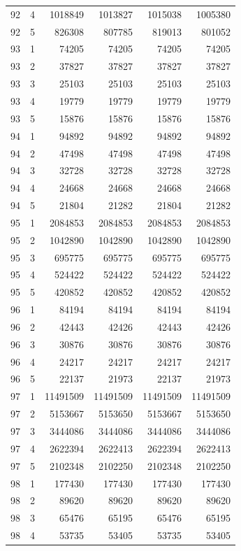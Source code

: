 \begin{longtable}{rrrrrr}
92 & 4 & 1018849 & 1013827 & 1015038 & 1005380 \\
92 & 5 & 826308 & 807785 & 819013 & 801052 \\
93 & 1 & 74205 & 74205 & 74205 & 74205 \\
93 & 2 & 37827 & 37827 & 37827 & 37827 \\
93 & 3 & 25103 & 25103 & 25103 & 25103 \\
93 & 4 & 19779 & 19779 & 19779 & 19779 \\
93 & 5 & 15876 & 15876 & 15876 & 15876 \\
94 & 1 & 94892 & 94892 & 94892 & 94892 \\
94 & 2 & 47498 & 47498 & 47498 & 47498 \\
94 & 3 & 32728 & 32728 & 32728 & 32728 \\
94 & 4 & 24668 & 24668 & 24668 & 24668 \\
94 & 5 & 21804 & 21282 & 21804 & 21282 \\
95 & 1 & 2084853 & 2084853 & 2084853 & 2084853 \\
95 & 2 & 1042890 & 1042890 & 1042890 & 1042890 \\
95 & 3 & 695775 & 695775 & 695775 & 695775 \\
95 & 4 & 524422 & 524422 & 524422 & 524422 \\
95 & 5 & 420852 & 420852 & 420852 & 420852 \\
96 & 1 & 84194 & 84194 & 84194 & 84194 \\
96 & 2 & 42443 & 42426 & 42443 & 42426 \\
96 & 3 & 30876 & 30876 & 30876 & 30876 \\
96 & 4 & 24217 & 24217 & 24217 & 24217 \\
96 & 5 & 22137 & 21973 & 22137 & 21973 \\
97 & 1 & 11491509 & 11491509 & 11491509 & 11491509 \\
97 & 2 & 5153667 & 5153650 & 5153667 & 5153650 \\
97 & 3 & 3444086 & 3444086 & 3444086 & 3444086 \\
97 & 4 & 2622394 & 2622413 & 2622394 & 2622413 \\
97 & 5 & 2102348 & 2102250 & 2102348 & 2102250 \\
98 & 1 & 177430 & 177430 & 177430 & 177430 \\
98 & 2 & 89620 & 89620 & 89620 & 89620 \\
98 & 3 & 65476 & 65195 & 65476 & 65195 \\
98 & 4 & 53735 & 53405 & 53735 & 53405 \\

\end{longtable}
